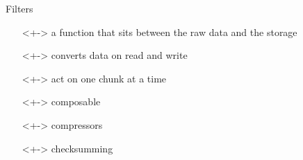 \documentclass{beamer}
\begin{document}
\begin{frame}{Filters}
  \begin{definition}[Filter]
    \begin{itemize}
    \item[]<+-> a function that sits between the raw data and the storage
    \item[]<+-> converts data on read and write
    \item[]<+-> act on one chunk at a time
    \item[]<+-> composable
    \item[]<+-> compressors
    \item[]<+-> checksumming
    \end{itemize}
  \end{definition}
\end{frame}
      
\end{document}
